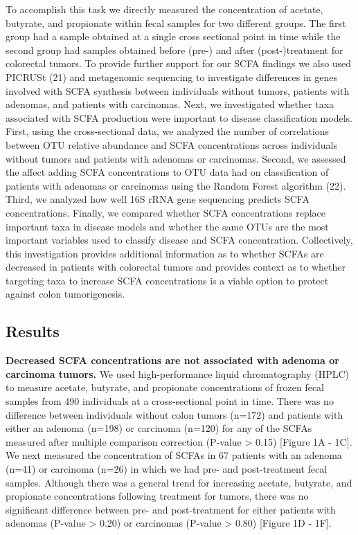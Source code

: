 \documentclass[11pt,]{article}
\begin{document}
To accomplish this task we directly measured the concentration of
acetate, butyrate, and propionate within fecal samples for two different
groups. The first group had a sample obtained at a single cross
sectional point in time while the second group had samples obtained
before (pre-) and after (post-)treatment for colorectal tumors. To
provide further support for our SCFA findings we also used PICRUSt (21)
and metagenomic sequencing to investigate differences in genes involved
with SCFA synthesis between individuals without tumors, patients with
adenomas, and patients with carcinomas. Next, we investigated whether
taxa associated with SCFA production were important to disease
classification models. First, using the cross-sectional data, we
analyzed the number of correlations between OTU relative abundance and
SCFA concentrations across individuals without tumors and patients with
adenomas or carcinomas. Second, we assessed the affect adding SCFA
concentrations to OTU data had on classification of patients with
adenomas or carcinomas using the Random Forest algorithm (22). Third, we
analyzed how well 16S rRNA gene sequencing predicts SCFA concentrations.
Finally, we compared whether SCFA concentrations replace important taxa
in disease models and whether the same OTUs are the most important
variables used to classify disease and SCFA concentration. Collectively,
this investigation provides additional information as to whether SCFAs
are decreased in patients with colorectal tumors and provides context as
to whether targeting taxa to increase SCFA concentrations is a viable
option to protect against colon tumorigenesis.

\newpage

\subsection{Results}\label{results}

\textbf{Decreased SCFA concentrations are not associated with adenoma or
carcinoma tumors.} We used high-performance liquid chromatography (HPLC)
to measure acetate, butyrate, and propionate concentrations of frozen
fecal samples from 490 individuals at a cross-sectional point in time.
There was no difference between individuals without colon tumors (n=172)
and patients with either an adenoma (n=198) or carcinoma (n=120) for any
of the SCFAs measured after multiple comparison correction (P-value
\textgreater{} 0.15) {[}Figure 1A - 1C{]}. We next measured the
concentration of SCFAs in 67 patients with an adenoma (n=41) or
carcinoma (n=26) in which we had pre- and post-treatment fecal samples.
Although there was a general trend for increasing acetate, butyrate, and
propionate concentrations following treatment for tumors, there was no
significant difference between pre- and post-treatment for either
patients with adenomas (P-value \textgreater{} 0.20) or carcinomas
(P-value \textgreater{} 0.80) {[}Figure 1D - 1F{]}.
\end{document}
